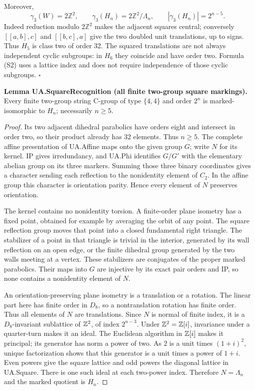 Moreover, \[
 \gamma_3(W)=2\mathbb Z^2,
 \qquad \gamma_3(H_n)=2\mathbb Z^2/\Lambda_n,
 \qquad |\gamma_3(H_n)|=2^{n-5}.                         \tag{S2}
\] Indeed reduction modulo \(2\mathbb Z^2\) makes the adjacent squares
central; conversely \([[a,b],c]\) and \([[b,c],a]\) give the two doubled
unit translations, up to signs. Thus \(H_5\) is class two of order 32.
The squared translations are not always independent cyclic subgroups: in
\(H_6\) they coincide and have order two. Formula (S2) uses a lattice
index and does not require independence of those cyclic subgroups.
\(\square\)

\textbf{Lemma UA.SquareRecognition (all finite two-group square markings).}
Every finite two-group string C-group of type $\{4,4\}$ and order $2^n$
is marked-isomorphic to $H_n$; necessarily $n\ge5$.
\begin{proof}
Its two adjacent dihedral parabolics have orders eight and intersect in
order two, so their product already has 32 elements. Thus $n\ge5$.
The complete affine presentation of UA.Affine maps onto the given group $G$;
write $N$ for its kernel. IP gives irredundancy, and UA.Phi identifies
$G/G'$ with the elementary abelian group on its three markers. Summing
those three binary coordinates gives a character sending each reflection
to the nonidentity element of $C_2$. In the affine group this character is
orientation parity. Hence every element of $N$ preserves orientation.

The kernel contains no nonidentity torsion. A finite-order plane isometry
has a fixed point, obtained for example by averaging the orbit of any point.
The square reflection group moves that point into a closed fundamental right
triangle. The stabilizer of a point in that triangle is trivial in the
interior, generated by its wall reflection on an open edge, or the finite
dihedral group generated by the two walls meeting at a vertex. These
stabilizers are conjugates of the proper marked parabolics. Their maps into
$G$ are injective by its exact pair orders and IP, so none contains a
nonidentity element of $N$.

An orientation-preserving plane isometry is a translation or a rotation.
The linear part here has finite order in $D_8$, so a nontranslation rotation
has finite order. Thus all elements of $N$ are translations. Since $N$ is
normal of finite index, it is a $D_8$-invariant sublattice of $\mathbb Z^2$, of
index $2^{n-3}$. Under $\mathbb Z^2=\mathbb Z[i]$, invariance under a quarter-turn makes
it an ideal. The Euclidean algorithm in $\mathbb Z[i]$ makes it principal; its
generator has norm a power of two. As $2$ is a unit times $(1+i)^2$,
unique factorization shows that this generator is a unit times a power of
$1+i$. Even powers give the square lattice and odd powers the diagonal
lattice in UA.Square. There is one such ideal at each two-power index.
Therefore $N=\Lambda_n$ and the marked quotient is $H_n$.
\end{proof}

